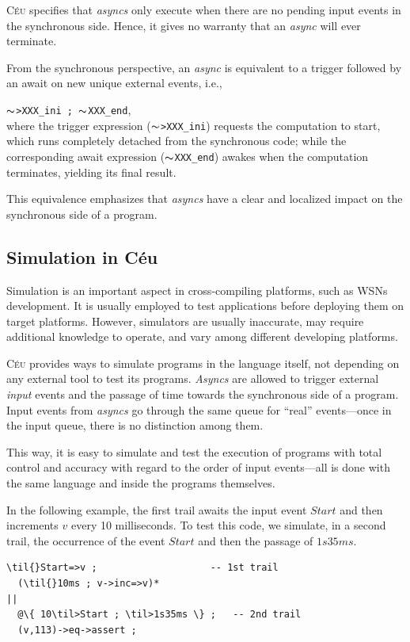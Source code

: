 \documentclass{sig-alternate-ipsn09}
\newcommand{\2}{\;\;}
\newcommand{\5}{\;\;\;\;\;}
\newcommand{\til}{$\thicksim$}
\newcommand{\CEU}{\textsc{C\'{e}u}}
\newcommand{\code}[1] {{\small{\texttt{#1}}}}
\newcommand{\Code}[1] {\texttt{#1}}
\begin{document}
\CEU{} specifies that \emph{asyncs} only execute when there are no pending 
input events in the synchronous side.
Hence, it gives no warranty that an \emph{async} will ever terminate.

From the synchronous perspective, an \emph{async} is equivalent to a trigger 
followed by an await on new unique external events, i.e.,

\Code{\til>XXX\_ini ; \til{}XXX\_end},\\
where the trigger expression (\code{\til>XXX\_ini}) requests the computation to 
start, which runs completely detached from the synchronous code; while the 
corresponding await expression (\code{\til{}XXX\_end}) awakes when the 
computation terminates, yielding its final result.

This equivalence emphasizes that \emph{asyncs} have a clear and localized 
impact on the synchronous side of a program.

\subsection{Simulation in C\'eu}
\label{sec:ceu:simul}

Simulation is an important aspect in cross-compiling platforms, such as WSNs 
development.
It is usually employed to test applications before deploying them on target 
platforms.
However, simulators are usually inaccurate, may require additional knowledge to 
operate, and vary among different developing platforms.

\CEU{} provides ways to simulate programs in the language itself, not depending 
on any external tool to test its programs.
\emph{Asyncs} are allowed to trigger external \emph{input} events and the 
passage of time towards the synchronous side of a program.
Input events from \emph{asyncs} go through the same queue for ``real'' 
events---once in the input queue, there is no distinction among them.

This way, it is easy to simulate and test the execution of programs with total 
control and accuracy with regard to the order of input events---all is done 
with the same language and inside the programs themselves.

In the following example, the first trail awaits the input event $Start$ and 
then increments $v$ every 10 milliseconds.
To test this code, we simulate, in a second trail, the occurrence of the event 
$Start$ and then the passage of $1s35ms$.

\begin{Verbatim}[commandchars=\\\{\}]
  \til{}Start=>v ;                    -- 1st trail
  (\til{}10ms ; v->inc=>v)*
||
  @\{ 10\til>Start ; \til>1s35ms \} ;   -- 2nd trail
  (v,113)->eq->assert ;
\end{Verbatim}
\end{document}

